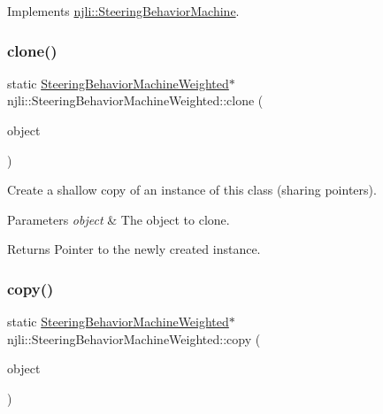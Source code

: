 Implements \mbox{\hyperlink{classnjli_1_1_steering_behavior_machine_aea431466acb4ef73220206bbcd515a9a}{njli\+::\+Steering\+Behavior\+Machine}}.

\mbox{\label{classnjli_1_1_steering_behavior_machine_weighted_ad1c677f04a95b4a56df14ff847bbe161}} 
\subsubsection{\texorpdfstring{clone()}{clone()}}
{\footnotesize\ttfamily static \mbox{\hyperlink{classnjli_1_1_steering_behavior_machine_weighted}{Steering\+Behavior\+Machine\+Weighted}}$\ast$ njli\+::\+Steering\+Behavior\+Machine\+Weighted\+::clone (\begin{DoxyParamCaption}\item[{const \mbox{\hyperlink{classnjli_1_1_steering_behavior_machine_weighted}{Steering\+Behavior\+Machine\+Weighted}} \&}]{object }\end{DoxyParamCaption})\hspace{0.3cm}{\ttfamily [static]}}

Create a shallow copy of an instance of this class (sharing pointers).


\begin{DoxyParams}{Parameters}
{\em object} & The object to clone.\\
\hline
\end{DoxyParams}
\begin{DoxyReturn}{Returns}
Pointer to the newly created instance. 
\end{DoxyReturn}
\mbox{\label{classnjli_1_1_steering_behavior_machine_weighted_ac488695d16aadd9726218938e9be5fa9}} 
\subsubsection{\texorpdfstring{copy()}{copy()}}
{\footnotesize\ttfamily static \mbox{\hyperlink{classnjli_1_1_steering_behavior_machine_weighted}{Steering\+Behavior\+Machine\+Weighted}}$\ast$ njli\+::\+Steering\+Behavior\+Machine\+Weighted\+::copy (\begin{DoxyParamCaption}\item[{const \mbox{\hyperlink{classnjli_1_1_steering_behavior_machine_weighted}{Steering\+Behavior\+Machine\+Weighted}} \&}]{object }\end{DoxyParamCaption})\hspace{0.3cm}{\ttfamily [static]}}


